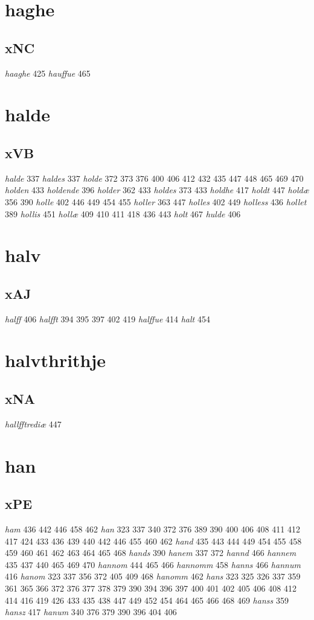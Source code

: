 \documentclass[a4paper,twocolumn]{article}
\begin{document}
\section{haghe}
\label{sec:org1625c7e}
\subsection{xNC}
\label{sec:org77adc2f}
\emph{haaghe} 425 \emph{hauffue} 465 
\section{halde}
\label{sec:orgc84c69b}
\subsection{xVB}
\label{sec:orgbd042d3}
\emph{halde} 337 \emph{haldes} 337 \emph{holde} 372 373 376 400 406 412 432 435 447 448 465 469 470 \emph{holden} 433 \emph{holdende} 396 \emph{holder} 362 433 \emph{holdes} 373 433 \emph{holdhe} 417 \emph{holdt} 447 \emph{holdæ} 356 390 \emph{holle} 402 446 449 454 455 \emph{holler} 363 447 \emph{holles} 402 449 \emph{holless} 436 \emph{hollet} 389 \emph{hollis} 451 \emph{hollæ} 409 410 411 418 436 443 \emph{holt} 467 \emph{hulde} 406 
\section{halv}
\label{sec:org1e0dbfa}
\subsection{xAJ}
\label{sec:orga6512e1}
\emph{halff} 406 \emph{halfft} 394 395 397 402 419 \emph{halffue} 414 \emph{halt} 454 
\section{halvthrithje}
\label{sec:org41b718a}
\subsection{xNA}
\label{sec:org158b621}
\emph{hallfftrediæ} 447 
\section{han}
\label{sec:org03b685a}
\subsection{xPE}
\label{sec:org87493ed}
\emph{ham} 436 442 446 458 462 \emph{han} 323 337 340 372 376 389 390 400 406 408 411 412 417 424 433 436 439 440 442 446 455 460 462 \emph{hand} 435 443 444 449 454 455 458 459 460 461 462 463 464 465 468 \emph{hands} 390 \emph{hanem} 337 372 \emph{hannd} 466 \emph{hannem} 435 437 440 465 469 470 \emph{hannom} 444 465 466 \emph{hannomm} 458 \emph{hanns} 466 \emph{hannum} 416 \emph{hanom} 323 337 356 372 405 409 468 \emph{hanomm} 462 \emph{hans} 323 325 326 337 359 361 365 366 372 376 377 378 379 390 394 396 397 400 401 402 405 406 408 412 414 416 419 426 433 435 438 447 449 452 454 464 465 466 468 469 \emph{hanss} 359 \emph{hansz} 417 \emph{hanum} 340 376 379 390 396 404 406 
\end{document}
